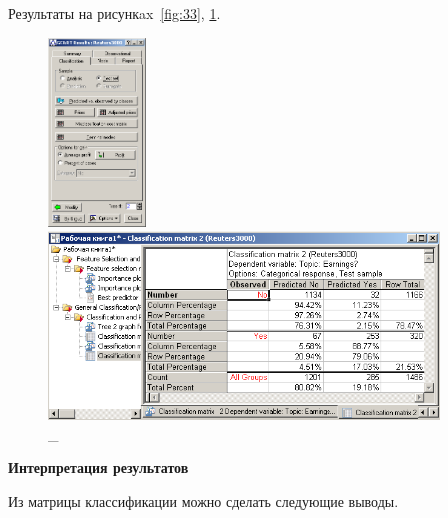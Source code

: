Результаты на рисункax~\ref{fig:33}, \ref{fig:34}.

\begin{figure}[!h]
  \centering

  \begin{minipage}{0.29\textwidth}
    \centering

    \includegraphics[height=5cm]
    {inc/33.PNG}

    \caption{\_}

    \label{fig:33}
  \end{minipage}
  \begin{minipage}{0.69\textwidth}
    \centering

    \includegraphics[height=5cm]
    {inc/34.PNG}

    \caption{\_}

    \label{fig:34}
  \end{minipage}
\end{figure}

\newpage

\begin{center}
  \textbf{Интерпретация результатов}
\end{center}

Из матрицы классификации можно сделать следующие выводы.

